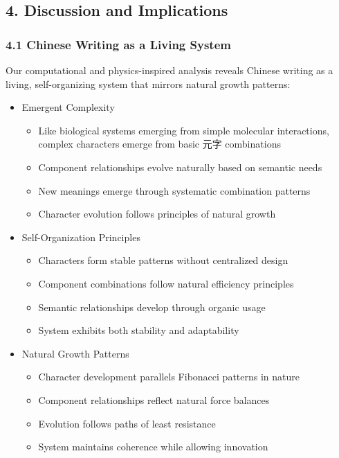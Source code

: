 \documentclass[
  11pt,
  letterpaper,
]{article}
\providecommand{\tightlist}{%
  \setlength{\itemsep}{0pt}\setlength{\parskip}{0pt}}
\begin{document}
\hypertarget{discussion-and-implications}{%
\subsection{4. Discussion and
Implications}\label{discussion-and-implications}}

\hypertarget{chinese-writing-as-a-living-system}{%
\subsubsection{4.1 Chinese Writing as a Living
System}\label{chinese-writing-as-a-living-system}}

Our computational and physics-inspired analysis reveals Chinese writing
as a living, self-organizing system that mirrors natural growth
patterns:

\begin{itemize}
\tightlist
\item
  Emergent Complexity

  \begin{itemize}
  \tightlist
  \item
    Like biological systems emerging from simple molecular interactions,
    complex characters emerge from basic 元字 combinations
  \item
    Component relationships evolve naturally based on semantic needs
  \item
    New meanings emerge through systematic combination patterns
  \item
    Character evolution follows principles of natural growth
  \end{itemize}
\item
  Self-Organization Principles

  \begin{itemize}
  \tightlist
  \item
    Characters form stable patterns without centralized design
  \item
    Component combinations follow natural efficiency principles
  \item
    Semantic relationships develop through organic usage
  \item
    System exhibits both stability and adaptability
  \end{itemize}
\item
  Natural Growth Patterns

  \begin{itemize}
  \tightlist
  \item
    Character development parallels Fibonacci patterns in nature
  \item
    Component relationships reflect natural force balances
  \item
    Evolution follows paths of least resistance
  \item
    System maintains coherence while allowing innovation
  \end{itemize}
\end{itemize}
\end{document}
